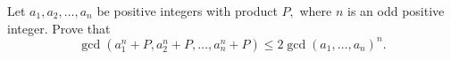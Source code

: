 Let $a_1,a_2,\dots, a_n$ be positive integers with product $P,$ where $n$ is an odd positive integer. Prove that $$\gcd(a_1^n+P,a_2^n+P,\dots, a_n^n+P)\le 2\gcd(a_1,\dots, a_n)^n.$$
